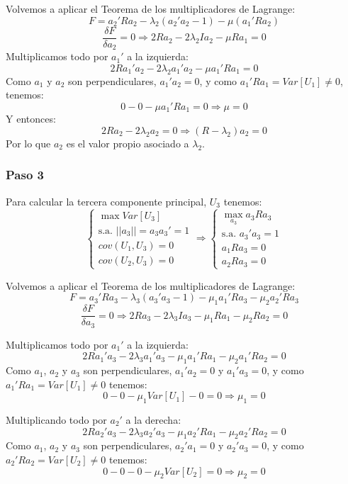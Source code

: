 \documentclass[11pt,a4paper]{article}
\begin{document}
Volvemos a aplicar el Teorema de los multiplicadores de Lagrange:
$$F = a_{2}'Ra_{2} - \lambda_{2}(a_{2}'a_{2} - 1) - \mu(a_{1}'Ra_{2})$$
$$\frac{\delta F}{\delta a_{2}} = 0 \Rightarrow 2Ra_{2} - 2\lambda_{2}Ia_{2} - \mu Ra_{1} = 0 $$
Multiplicamos todo por $a_{1}'$ a la izquierda:
$$2Ra_{1}'a_{2} - 2\lambda_{2}a_{1}'a_{2} - \mu a_{1}'Ra_{1} = 0$$
Como $a_{1}$ y $a_{2}$ son perpendiculares, $a_{1}'a_{2} = 0$, y como $a_{1}'Ra_{1} = Var[U_{1}] \neq 0$, tenemos:
$$0 - 0 - \mu a_{1}'Ra_{1} = 0 \Rightarrow \mu = 0$$
Y entonces:
$$2Ra_{2} - 2\lambda_{2}a_{2} = 0 \Rightarrow (R - \lambda_{2})a_{2} = 0$$
Por lo que $a_{2}$ es el valor propio asociado a $\lambda_{2}$.

\subsubsection{Paso 3}

Para calcular la tercera componente principal, $U_{3}$ tenemos:
$$\begin{cases}
\max Var[U_{3}] \\
\text{s.a. } ||a_{3}|| = a_{3}a_{3}' = 1 \\
cov(U_{1}, U_{3}) = 0 \\
cov(U_{2}, U_{3}) = 0
\end{cases} \Rightarrow \begin{cases}
\max_{a_{3}} a_{3}Ra_{3} \\
\text{s.a. } a_{3}'a_{3} = 1 \\
a_{1}Ra_{3} = 0 \\
a_{2}Ra_{3} = 0
\end{cases}$$

Volvemos a aplicar el Teorema de los multiplicadores de Lagrange:
$$F = a_{3}'Ra_{3} - \lambda_{3}(a_{3}'a_{3} - 1) - \mu_{1} a_{1}'Ra_{3} - \mu_{2} a_{2}'Ra_{3}$$
$$\frac{\delta F}{\delta a_{3}} = 0 \Rightarrow 2Ra_{3} - 2\lambda_{3}Ia_{3} - \mu_{1}Ra_{1} - \mu_{2}Ra_{2} = 0$$

Multiplicamos todo por $a_{1}'$ a la izquierda:
$$2Ra_{1}'a_{3} - 2\lambda_{3}a_{1}'a_{3} - \mu_{1}a_{1}'Ra_{1} - \mu_{2}a_{1}'Ra_{2} = 0$$
Como $a_{1}$, $a_{2}$ y $a_{3}$ son perpendiculares, $a_{1}'a_{2} = 0$ y $a_{1}'a_{3} = 0$, y como $a_{1}'Ra_{1} = Var[U_{1}] \neq 0$ tenemos:
$$0 - 0 - \mu_{1}Var[U_{1}] - 0 = 0 \Rightarrow \mu_{1} = 0$$

Multiplicando todo por $a_{2}'$ a la derecha:
$$2Ra_{2}'a_{3} - 2\lambda_{3}a_{2}'a_{3} - \mu_{1}a_{2}'Ra_{1} - \mu_{2}a_{2}'Ra_{2} = 0$$
Como $a_{1}$, $a_{2}$ y $a_{3}$ son perpendiculares, $a_{2}'a_{1} = 0$ y $a_{2}'a_{3} = 0$, y como $a_{2}'Ra_{2} = Var[U_{2}] \neq 0$ tenemos:
$$0 - 0 - 0 - \mu_{2}Var[U_{2}] = 0 \Rightarrow \mu_{2} = 0$$
\end{document}
